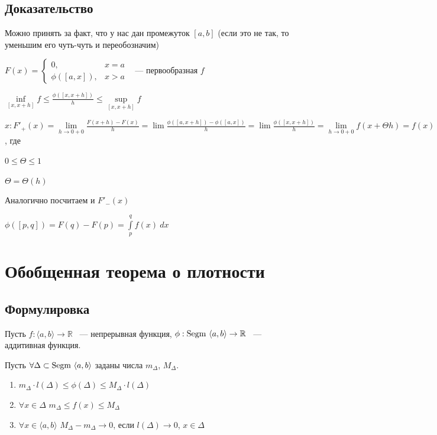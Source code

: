 \documentclass{article}
\begin{document}
        \subsection{Доказательство}
        
            Можно принять за факт, что у нас дан промежуток $[a, b]$ (если это не так, то уменьшим его чуть-чуть и переобозначим)
            
            $F(x) = \begin{cases} 0{,} & x = a \\ \phi([a, x]){,} & x > a \end{cases}$ ~--- первообразная $f$
            
            $\inf\limits_{[x, x + h]} f \leq \frac{\phi([x, x + h])}{h} \leq \sup\limits_{[x, x + h]} f$
            
            $x : F'_+(x) = \lim\limits_{h \rightarrow 0 + 0} \frac{F(x + h) - F(x)}{h} = \lim \frac{\phi([a, x + h]) - \phi([a, x])}{h} = \lim \frac{\phi([x, x + h])}{h} = \lim\limits_{h \rightarrow 0 + 0} f(x + \Theta h) = f(x)$, где
            
            $0 \leq \Theta \leq 1$
            
            $\Theta = \Theta(h)$
            
            Аналогично посчитаем и $F'_-(x)$
            
            $\phi([p, q]) = F(q) - F(p) = \int\limits^q_p f(x) \ dx$
            
    \newpage
    
    \section{Обобщенная теорема о плотности}
    
        \subsection{Формулировка}
            
            Пусть $f : \langle a, b \rangle \rightarrow \mathbb{R}$ ~--- непрерывная функция, $\phi : \Segm \langle a, b \rangle \rightarrow \mathbb{R}$ ~--- аддитивная функция.
        
            Пусть $\forall \Delta \subset \Segm \langle a, b \rangle$ заданы числа $m_{\Delta}$, $M_{\Delta}$.
        
            \begin{enumerate}
        
                \item $m_{\Delta} \cdot l(\Delta) \leq \phi(\Delta) \leq M_{\Delta} \cdot l(\Delta)$
            
                \item $\forall x \in \Delta$ $m_{\Delta} \leq f(x) \leq M_{\Delta}$
            
                \item $\forall x \in \langle a, b \rangle$ $M_{\Delta} - m_{\Delta} \rightarrow 0$, если $l(\Delta) \rightarrow 0$, $x \in \Delta$
            
            \end{enumerate}
            
\end{document}
